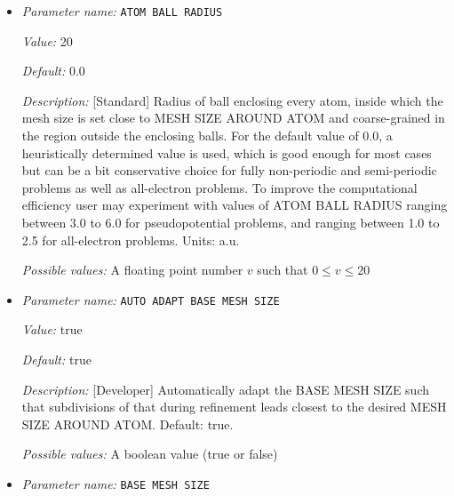 \begin{itemize}
\item {\it Parameter name:} {\tt ATOM BALL RADIUS}
\label{parameters:Finite element mesh parameters/Auto mesh generation parameters/ATOM BALL RADIUS}
\label{parameters:Finite_20element_20mesh_20parameters/Auto_20mesh_20generation_20parameters/ATOM_20BALL_20RADIUS}


{\it Value:} 20


{\it Default:} 0.0


{\it Description:} [Standard] Radius of ball enclosing every atom, inside which the mesh size is set close to MESH SIZE AROUND ATOM and coarse-grained in the region outside the enclosing balls. For the default value of 0.0, a heuristically determined value is used, which is good enough for most cases but can be a bit conservative choice for fully non-periodic and semi-periodic problems as well as all-electron problems. To improve the computational efficiency user may experiment with values of ATOM BALL RADIUS ranging between 3.0 to 6.0 for pseudopotential problems, and ranging between 1.0 to 2.5 for all-electron problems.  Units: a.u.


{\it Possible values:} A floating point number $v$ such that $0 \leq v \leq 20$
\item {\it Parameter name:} {\tt AUTO ADAPT BASE MESH SIZE}
\label{parameters:Finite element mesh parameters/Auto mesh generation parameters/AUTO ADAPT BASE MESH SIZE}
\label{parameters:Finite_20element_20mesh_20parameters/Auto_20mesh_20generation_20parameters/AUTO_20ADAPT_20BASE_20MESH_20SIZE}


{\it Value:} true


{\it Default:} true


{\it Description:} [Developer] Automatically adapt the BASE MESH SIZE such that subdivisions of that during refinement leads closest to the desired MESH SIZE AROUND ATOM. Default: true.


{\it Possible values:} A boolean value (true or false)
\item {\it Parameter name:} {\tt BASE MESH SIZE}
\label{parameters:Finite element mesh parameters/Auto mesh generation parameters/BASE MESH SIZE}
\label{parameters:Finite_20element_20mesh_20parameters/Auto_20mesh_20generation_20parameters/BASE_20MESH_20SIZE}



\end{itemize}
